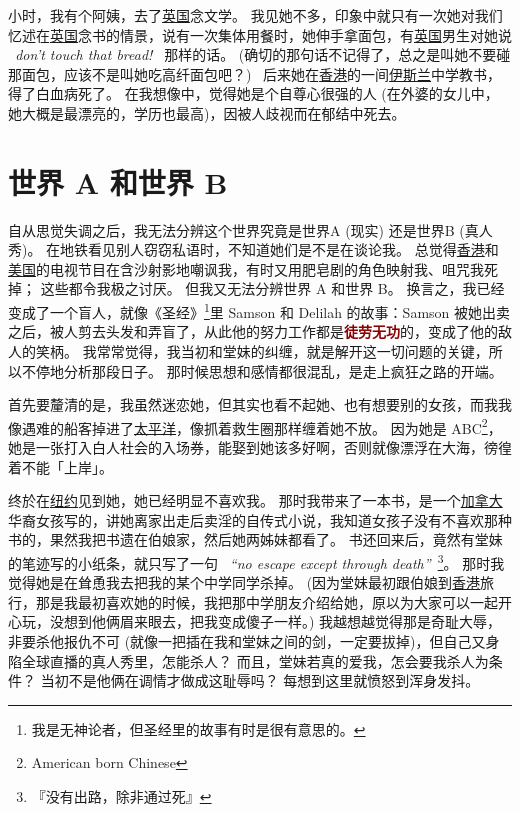 \documentclass[12pt]{report}
\newcommand{\speechEn}[1]{\textrm{\textit{\ #1\ }}}
\renewcommand{\em}[1]{\textbf{\textcolor{DarkRed}{#1}}}
\begin{document}
小时，我有个阿姨，去了\uline{英国}念文学。 我见她不多，印象中就只有一次她对我们忆述在\uline{英国}念书的情景，说有一次集体用餐时，她伸手拿面包，有\uline{英国}男生对她说 \speechEn{don't touch that bread!} 那样的话。 (确切的那句话不记得了，总之是叫她不要碰那面包，应该不是叫她吃高纤面包吧？) \ 后来她在\uline{香港}的一间\uline{伊斯兰}中学教书，得了白血病死了。 在我想像中，觉得她是个自尊心很强的人 (在外婆的女儿中，她大概是最漂亮的，学历也最高)，因被人歧视而在郁结中死去。

\chapter{世界 A 和世界 B}

自从思觉失调之后，我无法分辨这个世界究竟是世界A (现实) 还是世界B (真人秀)。 在地铁看见别人窃窃私语时，不知道她们是不是在谈论我。 总觉得\uline{香港}和\uline{美国}的电视节目在含沙射影地嘲讽我，有时又用肥皂剧的角色映射我、咀咒我死掉； 这些都令我极之讨厌。 但我又无法分辨世界 A 和世界 B。 换言之，我已经变成了一个盲人，就像《圣经》\footnote{我是无神论者，但圣经里的故事有时是很有意思的。}里 Samson 和 Delilah 的故事：Samson 被她出卖之后，被人剪去头发和弄盲了，从此他的努力工作都是\em{徒劳无功}的，变成了他的敌人的笑柄。 我常常觉得，我当初和堂妹的纠缠，就是解开这一切问题的关键，所以不停地分析那段日子。 那时候思想和感情都很混乱，是走上疯狂之路的开端。

首先要釐清的是，我虽然迷恋她，但其实也看不起她、也有想要别的女孩，而我我像遇难的船客掉进了\uline{太平洋}，像抓着救生圈那样缠着她不放。 因为她是 ABC\footnote{American born Chinese}，她是一张打入白人社会的入场券，能娶到她该多好啊，否则就像漂浮在大海，徬徨着不能「上岸」。

终於在\uline{纽约}见到她，她已经明显不喜欢我。 那时我带来了一本书，是一个\uline{加拿大}华裔女孩写的，讲她离家出走后卖淫的自传式小说，我知道女孩子没有不喜欢那种书的，果然我把书遗在伯娘家，然后她两姊妹都看了。 书还回来后，竟然有堂妹的笔迹写的小纸条，就只写了一句 \speechEn{``no escape except through death''}\footnote{『没有出路，除非通过死』}。 那时我觉得她是在耸恿我去把我的某个中学同学杀掉。 (因为堂妹最初跟伯娘到\uline{香港}旅行，那是我最初喜欢她的时候，我把那中学朋友介绍给她，原以为大家可以一起开心玩，没想到他俩眉来眼去，把我变成傻子一样。) 我越想越觉得那是奇耻大辱，非要杀他报仇不可 (就像一把插在我和堂妹之间的剑，一定要拔掉)，但自己又身陷全球直播的真人秀里，怎能杀人？ 而且，堂妹若真的爱我，怎会要我杀人为条件？ 当初不是他俩在调情才做成这耻辱吗？ 每想到这里就愤怒到浑身发抖。
\end{document}
